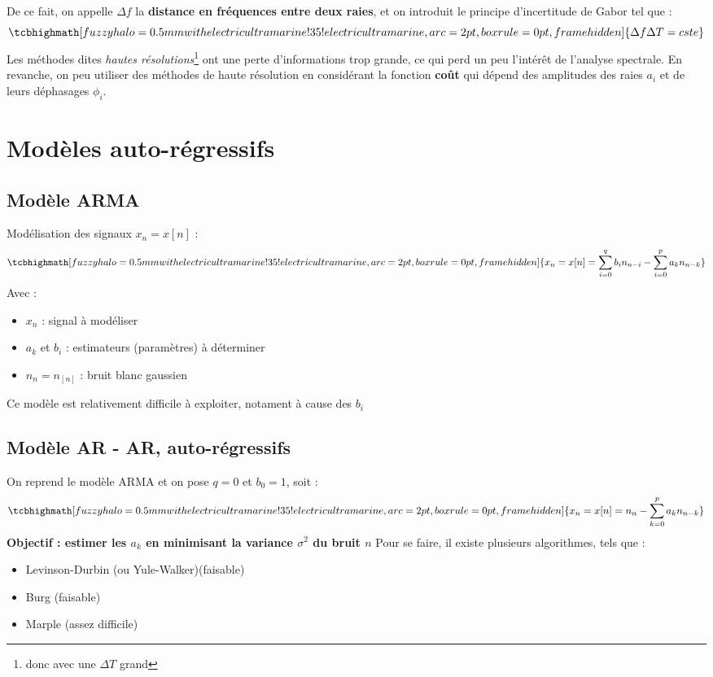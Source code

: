 \noindent De ce fait, on appelle $\Delta f$ la \textbf{distance en fréquences entre deux raies}, et on introduit le principe d'incertitude de Gabor tel que :
\begin{equation}
    \normalsize
    \tcbhighmath[fuzzy halo=0.5mm with electricultramarine!35!electricultramarine,arc=2pt,
    boxrule=0pt,frame hidden]{ 
        \Delta f \Delta T = cste
    } \nonumber
    \normalsize
\end{equation}
Les méthodes dites \textit{hautes résolutions}\footnote{donc avec une $\Delta T$ grand} ont une perte d'informations trop grande, ce qui perd un peu l'intérêt de l'analyse spectrale. En revanche, on peu utiliser des méthodes de haute résolution en considérant la fonction \textbf{coût} qui dépend des amplitudes des raies $a_{i}$ et de leurs déphasages $\phi_{i}$. 
\section{Modèles auto-régressifs}
\subsection{Modèle ARMA}
Modélisation des signaux $x_{n} = x[n]$ :
\begin{equation}
    \normalsize
    \tcbhighmath[fuzzy halo=0.5mm with electricultramarine!35!electricultramarine,arc=2pt,
    boxrule=0pt,frame hidden]{ 
        x_{n} = x[n] = \sum_{i=0}^{q}{b_{i}n_{n-i}} - \sum_{i=0}^{p}{a_{k}n_{n-k}}
    }
    \normalsize
\end{equation}
Avec :
\begin{itemize}
    \item $x_{n}$ : signal à modéliser
    \item $a_{k}$ et $b_{i}$ : estimateurs (paramètres) à déterminer
    \item $n_{n} = n_[n]$ : bruit blanc gaussien \newline
\end{itemize}
\noindent Ce modèle est relativement difficile à exploiter, notament à cause des $b_{i}$
\subsection{Modèle AR - AR, auto-régressifs}
On reprend le modèle ARMA et on pose $q=0$ et $b_{0}=1$, soit : 
\begin{equation}
    \normalsize
    \tcbhighmath[fuzzy halo=0.5mm with electricultramarine!35!electricultramarine,arc=2pt,
    boxrule=0pt,frame hidden]{ 
        x_{n} = x[n] = n_{n} - \sum_{k=0}^{p}{a_{k}n_{n-k}}
    }
    \normalsize
\end{equation}
\textbf{Objectif : estimer les $a_{k}$ en minimisant la variance $\sigma^{2}$ du bruit $n$} \newline
\noindent Pour se faire, il existe plusieurs algorithmes, tels que :
\begin{itemize}
    \item Levinson-Durbin (ou Yule-Walker)(faisable)
    \item Burg (faisable)
    \item Marple (assez difficile)
\end{itemize}
\newpage
